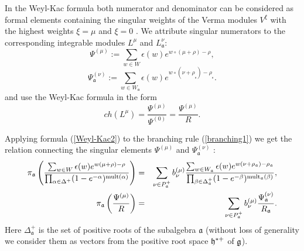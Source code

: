 \documentclass[12pt]{iopart}
\theoremstyle{definition}
\newcommand{\af}{\mathfrak{a}}
\begin{document}
In the Weyl-Kac formula both numerator and denominator  can be considered
as formal elements containing the singular weights of the Verma modules $V^{\xi}$
with the highest weights $\xi=\mu$ and $\xi=0$ \cite{humphreys1978rth}.
We attribute singular numerators to the corresponding integrable modules $L^{\mu }$
and $L_{\af}^{\nu }$:
\begin{equation*}
\Psi ^{\left( \mu \right) }:=\sum\limits_{w\in W}\epsilon (w)e^{w\circ (\mu +\rho )-\rho },
\end{equation*}
\begin{equation*}
\Psi _{ \af}^{\left( \nu \right) }:=
\sum\limits_{w\in W_{\af}}\epsilon (w)e^{w\circ (\nu +\rho
_{_{\af}})-\rho _{_{\af}}}.
\end{equation*}
and use the Weyl-Kac formula in the form
\begin{equation}
\label{Weyl-Kac2}
ch\left( L^{\mu }\right) =\frac{\Psi ^{\left( \mu \right) }}
{\Psi ^{\left( 0 \right) }}=\frac{\Psi ^{\left( \mu \right) }}{R}.
\end{equation}

Applying formula (\ref{Weyl-Kac2}) to the branching rule (\ref{branching1})
we get the relation connecting the
singular elements $\Psi ^{\left( \mu \right) }$ and $\Psi _{ \af}^{\left( \nu \right) }$ :
\begin{eqnarray}
\nonumber
\pi _{\af}\left( \frac{\sum_{w \in W}\epsilon (w )e^{w
(\mu +\rho )-\rho }}{\prod_{\alpha \in \Delta ^{+}}(1-e^{-\alpha })^{\mathrm{%
mult}(\alpha )}}\right) &=&\sum_{\nu \in P_{\af}^{+}}b_{\nu }^{(\mu )}%
\frac{\sum_{w \in W_{\af}}\epsilon (w )e^{w (\nu +\rho _{%
\af})-\rho _{\af}}}{\prod_{\beta \in \Delta _{\af%
}^{+}}(1-e^{-\beta })^{\mathrm{mult}_{\af}(\beta )}},  \label{eq:4} \\
\pi _{\af}\left( \frac{\Psi ^{\left( \mu \right) }}{R}\right)
&=&\sum_{\nu \in P_{\af}^{+}}b_{\nu }^{(\mu )}\frac{\Psi _{ \frak{%
a}}^{\left( \nu \right) }}{R_{\af}}.
\end{eqnarray}
Here $\Delta _{\af}^{+}$ is the set of
positive roots of the subalgebra $\af$ (without loss of generality we consider
them as vectors from the positive root space $\frak{h}^{\ast  +}$ of $\frak{g}$).
\end{document}
